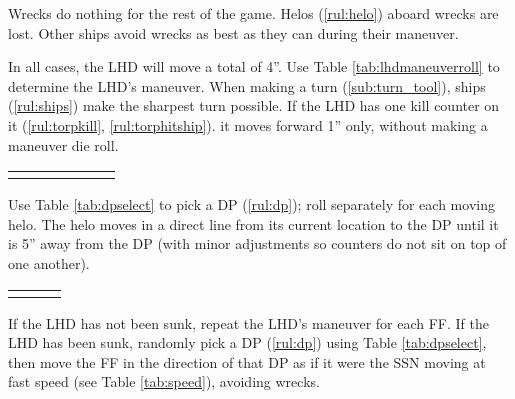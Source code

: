 \documentclass[../TacSubMicroRules.tex]{subfiles}
\begin{document}
 
Wrecks do nothing for the rest of the game.
Helos (\ref{rul:helo}) aboard wrecks are lost.
Other ships avoid wrecks as best as they can during their maneuver.

 
In all cases, the LHD will move a total of 4''.
Use Table \ref{tab:lhdmaneuverroll} to determine the LHD's maneuver.
When making a turn (\ref{sub:turn_tool}), ships (\ref{rul:ships}) make the sharpest turn possible.
If the LHD has one kill counter on it (\ref{rul:torpkill}, \ref{rul:torphitship}). it moves forward 1'' only, without making a maneuver die roll.
\begin{Table}
    \centering
    \begin{tabular}{R{0.15\linewidth}|L{0.65\linewidth}}
       \hline
       \hline
       \hline
    \end{tabular}
    \label{tab:lhdmaneuverroll}
\end{Table}

 
Use Table \ref{tab:dpselect} to pick a DP (\ref{rul:dp}); roll separately for each moving helo.
The helo moves in a direct line from its current location to the DP until it is 5'' away from the DP (with minor adjustments so counters do not sit on top of one another).
\begin{Table}
    \centering
    \begin{tabular}{R{0.3\linewidth}|L{0.3\linewidth}}
       \hline
       \hline
       \hline
    \end{tabular}
    \label{tab:dpselect}
\end{Table}

 
If the LHD has not been sunk, repeat the LHD's maneuver for each FF.
If the LHD has been sunk, randomly pick a DP (\ref{rul:dp}) using Table \ref{tab:dpselect}, then move the FF in the direction of that DP as if it were the SSN moving at fast speed (see Table \ref{tab:speed}), avoiding wrecks.
\end{document}
